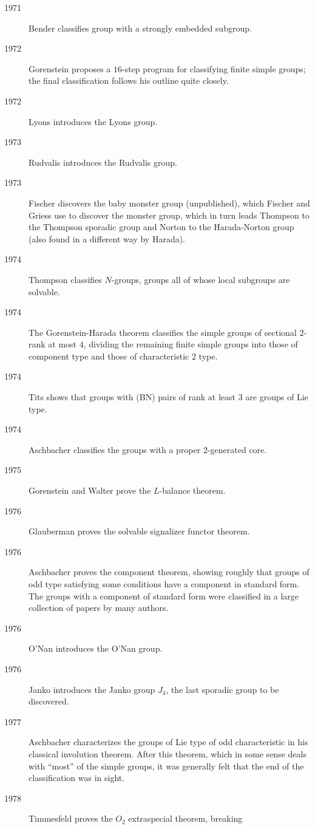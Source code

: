 \documentclass{ximera}
\begin{document}
\begin{description}
\item[1971] Bender classifies group with a strongly embedded subgroup.
\item[1972] Gorenstein proposes a $16$-step program for classifying
  finite simple groups; the final classification follows his outline
  quite closely.
\item[1972] Lyons introduces the Lyons group.
\item[1973] Rudvalis introduces the Rudvalis group.
\item[1973] Fischer discovers the baby monster group (unpublished),
  which Fischer and Griess use to discover the monster group, which in
  turn leads Thompson to the Thompson sporadic group and Norton to the
  Harada-Norton group (also found in a different way by Harada).
\item[1974] Thompson classifies $N$-groups, groups all of whose local
  subgroups are solvable.
\item[1974] The Gorenstein-Harada theorem classifies the simple groups
  of sectional $2$-rank at most $4$, dividing the remaining finite
  simple groups into those of component type and those of
  characteristic $2$ type.
\item[1974] Tits shows that groups with (BN) pairs of rank at least $3$
  are groups of Lie type.
\item[1974] Aschbacher classifies the groups with a proper $2$-generated
  core.
\item[1975] Gorenstein and Walter prove the $L$-balance theorem.
\item[1976] Glauberman proves the solvable signalizer functor theorem.
\item[1976] Aschbacher proves the component theorem, showing roughly
  that groups of odd type satisfying some conditions have a component
  in standard form. The groups with a component of standard form were
  classified in a large collection of papers by many authors.
\item[1976] O'Nan introduces the O'Nan group.
\item[1976]	Janko introduces the Janko group $J_4$, the last sporadic group to be discovered.
\item[1977] Aschbacher characterizes the groups of Lie type of odd
  characteristic in his classical involution theorem. After this
  theorem, which in some sense deals with ``most'' of the simple groups,
  it was generally felt that the end of the classification was in
  sight.
\item[1978] Timmesfeld proves the $O_2$ extraspecial theorem, breaking

\end{description}
\end{document}
